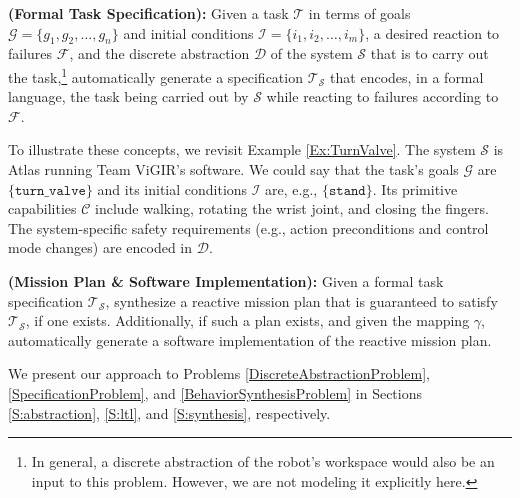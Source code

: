 \begin{myProblem}\label{SpecificationProblem}
\textbf{(Formal Task Specification):}
Given a task $\mathcal{T}$ in terms of goals $\mathcal{G} = \{ g_1, g_2, \ldots, g_n \}$ and initial conditions $\mathcal{I} = \{ i_1, i_2, \ldots, i_m \}$,
a desired reaction to failures $\mathcal{F}$,
and the discrete abstraction $\mathcal{D}$ of the system $\mathcal{S}$ that is to carry out the task,\footnote{In general, a discrete abstraction of the robot's workspace would also be an input to this problem. However, we are not modeling it explicitly here.}
 automatically generate a specification $\mathcal{T}_\mathcal{S}$ that encodes, in a formal language, the task being carried out by $\mathcal{S}$ while reacting to failures according to $\mathcal{F}$.
\end{myProblem}

To illustrate these concepts, we revisit Example \ref{Ex:TurnValve}. 
The system $\mathcal{S}$ is Atlas running Team ViGIR's software.
We could say that the task's goals $\mathcal{G}$ are $\{ \mathtt{turn\_valve} \}$ and its initial conditions $\mathcal{I}$ are, e.g., $\{ \mathtt{stand} \}$.
Its primitive capabilities $\mathcal{C}$ include walking, rotating the wrist joint, and closing the fingers.
The system-specific safety requirements (e.g., action preconditions and control mode changes) are encoded in $\mathcal{D}$.

\begin{myProblem}\label{BehaviorSynthesisProblem}
\textbf{(Mission Plan \& Software Implementation):}
Given a formal task specification $\mathcal{T}_\mathcal{S}$, synthesize a reactive mission plan that is guaranteed to satisfy $\mathcal{T}_\mathcal{S}$, if one exists.
Additionally, if such a plan exists, and given the mapping $\gamma$, automatically generate a software implementation of the reactive mission plan. 
\end{myProblem}

We present our approach to Problems \ref{DiscreteAbstractionProblem}, \ref{SpecificationProblem}, and \ref{BehaviorSynthesisProblem} in Sections \ref{S:abstraction}, \ref{S:ltl}, and \ref{S:synthesis}, respectively.

